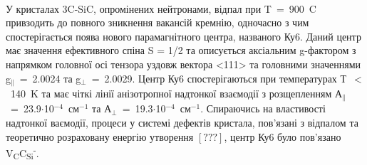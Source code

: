 \begin{minipage}{\textwidth}\mbox{}\\У кристалах 3C-SiC, опромінених нейтронами, відпал при T~=~900~\degree C привзодить до повного зникнення вакансій кремнію, одночасно з чим спостерігається поява нового парамагнітного центра, названого Ку6. Даний центр має значення ефективного спіна S = 1/2 та описується аксіальним g-фактором з напрямком головної осі тензора уздовж вектора <111> та головними значеннями g$_\parallel$~=~2.0024 та g$_\perp$~=~2.0029. Центр Ку6 спостерігаються при температурах Т~$<$~140~K та має чіткі лінії анізотропної надтонкої взаємодії з розщепленням А$_\parallel$~=~23.9$\cdot$10$^{-4}$~см$^{-1}$ та А$_\perp$~=~19.3$\cdot$10$^{-4}$~см$^{-1}$. Спираючись на властивості надтонкої ваємодії, процеси у системі дефектів кристала, пов'язані з відпалом та теоретично розраховану енергію утворення $[???]$, центр Ку6 було пов'язано V\textsubscript{C}C\textsubscript{Si}\textsuperscript{-}.
\end{minipage}


